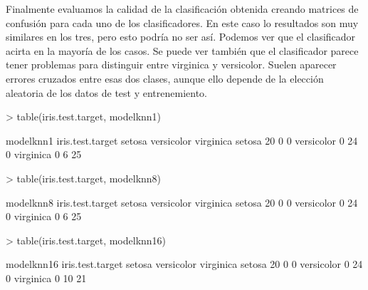\documentclass [a4paper] {article}
\begin{document}
Finalmente evaluamos la calidad de la clasificación obtenida creando matrices de confusión para cada uno de los clasificadores.
En este caso lo resultados son muy similares en los tres, pero esto podría no ser así.
Podemos ver que el clasificador acirta en la mayoría de los casos.
Se puede ver también que el clasificador parece tener problemas para distinguir entre virginica y versicolor.
Suelen aparecer errores cruzados entre esas dos clases, aunque ello depende de la elección aleatoria de los datos de test y entrenemiento.
\begin{Schunk}
\begin{Sinput}
> table(iris.test.target, modelknn1)
\end{Sinput}
\begin{Soutput}
                modelknn1
iris.test.target setosa versicolor virginica
      setosa         20          0         0
      versicolor      0         24         0
      virginica       0          6        25
\end{Soutput}
\begin{Sinput}
> table(iris.test.target, modelknn8)
\end{Sinput}
\begin{Soutput}
                modelknn8
iris.test.target setosa versicolor virginica
      setosa         20          0         0
      versicolor      0         24         0
      virginica       0          6        25
\end{Soutput}
\begin{Sinput}
> table(iris.test.target, modelknn16)
\end{Sinput}
\begin{Soutput}
                modelknn16
iris.test.target setosa versicolor virginica
      setosa         20          0         0
      versicolor      0         24         0
      virginica       0         10        21
\end{Soutput}
\end{Schunk}

\newpage
\end{document}
